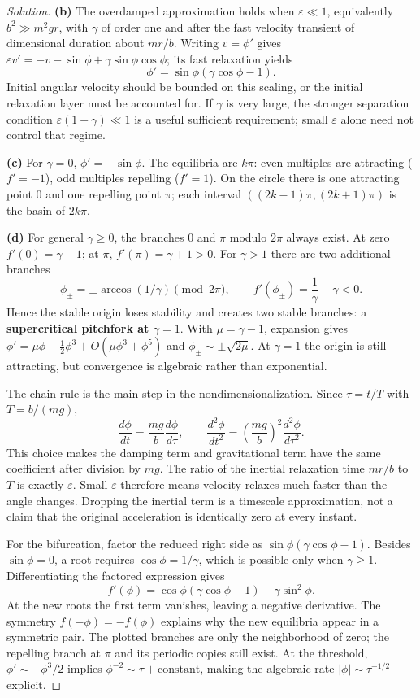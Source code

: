 \documentclass[10pt]{amsart}
\newenvironment{solution}
{\begin{proof}[Solution]}
{\end{proof}}
\begin{document}
\begin{enumerate}[label=\arabic*), leftmargin=*, itemsep=1em]
\begin{solution}
\textbf{(b)} The overdamped approximation holds when $\varepsilon\ll1$, equivalently $b^2\gg m^2gr$, with $\gamma$ of order one and after the fast velocity transient of dimensional duration about $mr/b$. Writing $v=\phi'$ gives $\varepsilon v'=-v-\sin\phi+\gamma\sin\phi\cos\phi$; its fast relaxation yields
\[
\phi'=\sin\phi(\gamma\cos\phi-1).
\]
Initial angular velocity should be bounded on this scaling, or the initial relaxation layer must be accounted for. If $\gamma$ is very large, the stronger separation condition $\varepsilon(1+\gamma)\ll1$ is a useful sufficient requirement; small $\varepsilon$ alone need not control that regime.

\textbf{(c)} For $\gamma=0$, $\phi'=-\sin\phi$. The equilibria are $k\pi$: even multiples are attracting ($f'=-1$), odd multiples repelling ($f'=1$). On the circle there is one attracting point $0$ and one repelling point $\pi$; each interval $((2k-1)\pi,(2k+1)\pi)$ is the basin of $2k\pi$.

\textbf{(d)} For general $\gamma\ge0$, the branches $0$ and $\pi$ modulo $2\pi$ always exist. At zero $f'(0)=\gamma-1$; at $\pi$, $f'(\pi)=\gamma+1>0$. For $\gamma>1$ there are two additional branches
\[
\phi_\pm=\pm\arccos(1/\gamma)\pmod{2\pi},\qquad
f'(\phi_\pm)=\frac1\gamma-\gamma<0.
\]
Hence the stable origin loses stability and creates two stable branches: a \textbf{supercritical pitchfork at $\gamma=1$}. With $\mu=\gamma-1$, expansion gives $\phi'=\mu\phi-\tfrac12\phi^3+O(\mu\phi^3+\phi^5)$ and $\phi_\pm\sim\pm\sqrt{2\mu}$. At $\gamma=1$ the origin is still attracting, but convergence is algebraic rather than exponential.

The chain rule is the main step in the nondimensionalization. Since $\tau=t/T$ with $T=b/(mg)$,
\[
\frac{d\phi}{dt}=\frac{mg}{b}\frac{d\phi}{d\tau},\qquad
\frac{d^2\phi}{dt^2}=\left(\frac{mg}{b}\right)^2\frac{d^2\phi}{d\tau^2}.
\]
This choice makes the damping term and gravitational term have the same coefficient after division by $mg$. The ratio of the inertial relaxation time $mr/b$ to $T$ is exactly $\varepsilon$. Small $\varepsilon$ therefore means velocity relaxes much faster than the angle changes. Dropping the inertial term is a timescale approximation, not a claim that the original acceleration is identically zero at every instant.

For the bifurcation, factor the reduced right side as $\sin\phi(\gamma\cos\phi-1)$. Besides $\sin\phi=0$, a root requires $\cos\phi=1/\gamma$, which is possible only when $\gamma\ge1$. Differentiating the factored expression gives
\[
f'(\phi)=\cos\phi(\gamma\cos\phi-1)-\gamma\sin^2\phi.
\]
At the new roots the first term vanishes, leaving a negative derivative. The symmetry $f(-\phi)=-f(\phi)$ explains why the new equilibria appear in a symmetric pair. The plotted branches are only the neighborhood of zero; the repelling branch at $\pi$ and its periodic copies still exist. At the threshold, $\phi'\sim-\phi^3/2$ implies $\phi^{-2}\sim\tau+\text{constant}$, making the algebraic rate $|\phi|\sim\tau^{-1/2}$ explicit.


\end{solution}
\end{enumerate}
\end{document}

